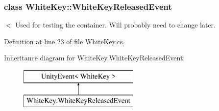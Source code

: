 \subsubsection{class White\+Key\+:\+:White\+Key\+Released\+Event}
$<$ Used for testing the container. Will probably need to change later. 

Definition at line 23 of file White\+Key.\+cs.

Inheritance diagram for White\+Key.\+White\+Key\+Released\+Event\+:\begin{figure}[H]
\begin{center}
\leavevmode
\includegraphics[height=2.000000cm]{group___white_key_types}
\end{center}
\end{figure}
